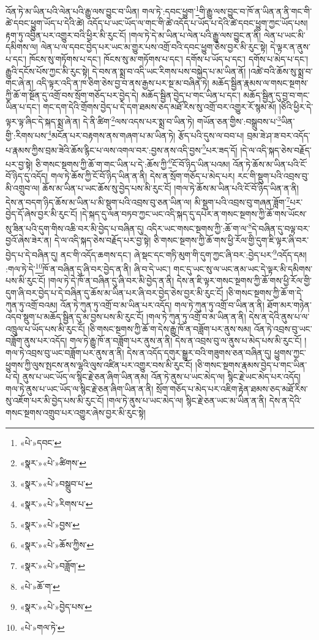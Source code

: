 འོན་ཏེ་མ་ཡིན་པའི་ལེན་པའི་རྒྱུ་ལས་བྱུང་བ་ཡིན། གལ་ཏེ་:དབང་ཕྱུག་\footnote{«པེ་»དབང་}གི་རྒྱུ་ལས་བྱུང་བ་ཁོ་ན་ཡིན་ན་ནི་གང་གི་ཚེ་དབང་ཕྱུག་ཡོད་པ་དེའི་ཚེ། འདོད་པ་ཡང་ཡོད་ལ་གང་གི་ཚེ་འདོད་པ་ཡོད་པ་དེའི་ཚེ་དབང་ཕྱུག་ཀྱང་ཡོད་པས། རྟག་ཏུ་འབྱིན་པར་འགྱུར་བའི་ཕྱིར་མི་རུང་ངོ། །གལ་ཏེ་དེ་མ་ཡིན་པ་ལེན་པའི་རྒྱུ་ལས་བྱུང་ན་ནི། ལེན་པ་ཡང་མི་དམིགས་ལ། ལེན་པ་ལ་དབང་བྱེད་པར་ཡང་མ་གྱུར་པས་འགྲོ་བའི་དབང་ཕྱུག་ཅེས་བྱར་མི་རུང་སྟེ། དེ་ལྟར་ན་ནུས་པ་དང་། ཁོངས་སུ་གཏོགས་པ་དང་། ཁོངས་སུ་མ་གཏོགས་པ་དང་། དགོས་པ་ཡོད་པ་དང་། དགོས་པ་མེད་པ་དང་། རྒྱུའི་དངོས་པོས་ཀྱང་མི་རུང་སྟེ། དེ་བས་ན་སྨྲ་བ་འདི་ཡང་རིགས་པས་བསྐྱེད་པ་མ་ཡིན་ནོ། །འཚེ་བའི་ཆོས་སུ་སྨྲ་བ་གང་ཞེ་ན། འདི་ལྟར་འདི་ན་ཁ་ཅིག་ཅེས་བྱ་བ་ནས་རྒྱས་པར་སྔ་མ་བཞིན་ཏེ། མཆོད་སྦྱིན་རྣམས་ལ་གསང་སྔགས་ཀྱི་ཆོ་ག་སྔོན་དུ་འགྲོ་བས་སྲོག་གཅོད་པར་བྱེད་དེ། མཆོད་སྦྱིན་བྱེད་པ་གང་ཡིན་པ་དང་། མཆོད་སྦྱིན་དུ་བྱ་བ་གང་ཡིན་པ་དང་། གང་དག་དེའི་གྲོགས་བྱེད་པ་དེ་དག་ཐམས་ཅད་མཐོ་རིས་སུ་འགྲོ་བར་འགྱུར་རོ་སྙམ་མོ། །ཅིའི་ཕྱིར་དེ་ལྟར་ལྟ་ཞིང་དེ་སྐད་སྨྲ་ཞེ་ན། དེ་ནི་ཚིག་\footnote{«སྣར་»«པེ་»ཚིགས་}ལས་འདས་པར་སྨྲ་བ་ཡིན་ཏེ། གཡོན་ཅན་གྱིས་:བསྒྲུབས་པ་\footnote{«སྣར་»«པེ་»བསྒྲུབ་པ་}ཡིན་གྱི་:རིགས་པས་\footnote{«སྣར་»«པེ་»རིགས་པ་}མངོན་པར་བརྟགས་ནས་གཞག་པ་མ་ཡིན་ཏེ། རྩོད་པའི་དུས་ལ་བབ་པ། བྲམ་ཟེ་ཤ་ཟ་བར་འདོད་པ་རྣམས་ཀྱིས་བྲམ་ཟེའི་ཆོས་རྙིང་པ་ལས་འགལ་བར་:བྱས་ནས་འདི་བྱས་\footnote{«སྣར་»«པེ་»བྱས་}པར་ཟད་དོ། །དེ་ལ་འདི་སྐད་ཅེས་བརྗོད་པར་བྱ་སྟེ། ཅི་གསང་སྔགས་ཀྱི་ཆོ་ག་གང་ཡིན་པ་དེ་:ཆོས་ཀྱི་\footnote{«སྣར་»«པེ་»ཆོས་ཀྱིས་}ངོ་བོ་ཉིད་ཡིན་པའམ། འོན་ཏེ་ཆོས་མ་ཡིན་པའི་ངོ་བོ་ཉིད་དུ་འདོད། གལ་ཏེ་ཆོས་ཀྱི་ངོ་བོ་ཉིད་ཡིན་ན་ནི། དེས་ན་སྲོག་གཅོད་པ་མེད་པར། རང་གི་སྡུག་པའི་འབྲས་བུ་མི་འགྲུབ་ལ། ཆོས་མ་ཡིན་པ་ཡང་ཆོས་སུ་བྱེད་པས་མི་རུང་ངོ། །གལ་ཏེ་ཆོས་མ་ཡིན་པའི་ངོ་བོ་ཉིད་ཡིན་ན་ནི། དེས་ན་བདག་ཉིད་ཆོས་མ་ཡིན་པ་མི་སྡུག་པའི་འབྲས་བུ་ཅན་ཡིན་ལ། མི་སྡུག་པའི་འབྲས་བུ་གཞན་ཟློག་\footnote{«སྣར་»«པེ་»བཟློག་}པར་བྱེད་དོ་ཞེས་བྱར་མི་རུང་ངོ། །དེ་སྐད་དུ་ལན་བཏབ་ཀྱང་ཡང་འདི་སྐད་དུ་དཔེར་ན་གསང་སྔགས་ཀྱི་ཆོ་གས་ཡོངས་སུ་ཟིན་པའི་དུག་གིས་འཆི་བར་མི་བྱེད་པ་བཞིན་དུ། འདིར་ཡང་གསང་སྔགས་ཀྱི་:ཆོ་ག་ལ་\footnote{«པེ་»ཆོ་ག་}དེ་བཞིན་དུ་བལྟ་བར་བྱའོ་ཞེས་ཟེར་ན། དེ་ལ་འདི་སྐད་ཅེས་བརྗོད་པར་བྱ་སྟེ། ཅི་གསང་སྔགས་ཀྱི་ཆོ་གས་ཕྱི་རོལ་གྱི་དུག་ཇི་ལྟར་ཞི་བར་བྱེད་པ་དེ་བཞིན་དུ། ནང་གི་འདོད་ཆགས་དང་། ཞེ་སྡང་དང་གཏི་མུག་གི་དུག་ཀྱང་ཞི་བར་:བྱེད་པར་\footnote{«སྣར་»«པེ་»བྱེད་པས་}འདོད་དམ། :གལ་ཏེ་དེ་\footnote{«པེ་»གལ་ཏེ་}ཁོ་ན་བཞིན་དུ་ཞི་བར་བྱེད་ན་ནི། ཞི་བ་དེ་ཡང་། གང་དུ་ཡང་སུ་ལ་ཡང་ནམ་ཡང་དེ་ལྟར་མི་དམིགས་པས་མི་རུང་ངོ། །གལ་ཏེ་དེ་ཁོ་ན་བཞིན་དུ་ཞི་བར་མི་བྱེད་ན་ནི། དེས་ན་ཇི་ལྟར་གསང་སྔགས་ཀྱི་ཆོ་གས་ཕྱི་རོལ་གྱི་དུག་ཞི་བར་བྱེད་པ་དེ་བཞིན་དུ་ཆོས་མ་ཡིན་པར་ཞི་བར་བྱེད་ཅེས་བྱར་མི་རུང་ངོ། །ཅི་གསང་སྔགས་ཀྱི་ཆོ་ག་དེ་ཀུན་ཏུ་འགྲོ་བའམ། འོན་ཏེ་ཀུན་ཏུ་འགྲོ་བ་མ་ཡིན་པར་འདོད། གལ་ཏེ་ཀུན་ཏུ་འགྲོ་བ་ཡིན་ན་ནི། ཐོག་མར་གཉེན་འདབ་སྡུག་པ་མཆོད་སྦྱིན་དུ་མ་བྱས་པས་མི་རུང་ངོ། །གལ་ཏེ་ཀུན་ཏུ་འགྲོ་བ་མ་ཡིན་ན་ནི། དེས་ན་དེའི་ནུས་པ་ལ་འཁྲུལ་པ་ཡོད་པས་མི་རུང་ངོ། །ཅི་གསང་སྔགས་ཀྱི་ཆོ་ག་དེས་རྒྱུ་ཁོ་ན་བཟློག་པར་ནུས་སམ། འོན་ཏེ་འབྲས་བུ་ཡང་བཟློག་ནུས་པར་འདོད། གལ་ཏེ་རྒྱུ་ཁོ་ན་བཟློག་པར་ནུས་ན་ནི། དེས་ན་འབྲས་བུ་ལ་ནུས་པ་མེད་པས་མི་རུང་ངོ། །གལ་ཏེ་འབྲས་བུ་ཡང་བཟློག་པར་ནུས་ན་ནི། དེས་ན་འདོད་དགུར་སྒྱུར་བའི་གཟུགས་ཅན་བཞིན་དུ། ཕྱུགས་ཀྱང་ཕྱུགས་ཀྱི་ལུས་སྤངས་ནས་ལྷའི་ལུས་འཛིན་པར་འགྱུར་བས་མི་རུང་ངོ། །ཅི་གསང་སྔགས་རྣམས་བྱེད་པ་གང་ཡིན་པ་དེ། ནུས་པ་ཡང་ཡོད་ལ་སྙིང་རྗེ་ཅན་ཞིག་ཡིན་ནམ། འོན་ཏེ་ནུས་པ་ཡང་མེད་ལ། སྙིང་རྗེ་ཡང་མེད་པར་འདོད། གལ་ཏེ་ནུས་པ་ཡང་ཡོད་ལ་སྙིང་རྗེ་ཅན་ཞིག་ཡིན་ན་ནི། སྲོག་གཅོད་པ་མེད་པར་འཇིག་རྟེན་ཐམས་ཅད་མཐོ་རིས་སུ་འཇོག་པར་མི་བྱེད་པས་མི་རུང་ངོ། །གལ་ཏེ་ནུས་པ་ཡང་མེད་ལ། སྙིང་རྗེ་ཅན་ཡང་མ་ཡིན་ན་ནི། དེས་ན་དེའི་གསང་སྔགས་འགྲུབ་པར་འགྱུར་ཞེས་བྱར་མི་རུང་སྟེ། 